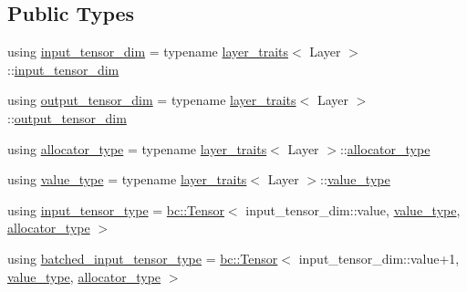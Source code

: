 \subsection*{Public Types}
\begin{DoxyCompactItemize}
\item 
using \hyperlink{structbc_1_1nn_1_1Layer__Manager_a2f124b1c1df68e184adf91d16cf0a5c3}{input\+\_\+tensor\+\_\+dim} = typename \hyperlink{structbc_1_1nn_1_1layer__traits}{layer\+\_\+traits}$<$ Layer $>$\+::\hyperlink{structbc_1_1nn_1_1Layer__Manager_a2f124b1c1df68e184adf91d16cf0a5c3}{input\+\_\+tensor\+\_\+dim}
\item 
using \hyperlink{structbc_1_1nn_1_1Layer__Manager_aabdbf2c4a435aa8256a9a7fac4ee3fc2}{output\+\_\+tensor\+\_\+dim} = typename \hyperlink{structbc_1_1nn_1_1layer__traits}{layer\+\_\+traits}$<$ Layer $>$\+::\hyperlink{structbc_1_1nn_1_1Layer__Manager_aabdbf2c4a435aa8256a9a7fac4ee3fc2}{output\+\_\+tensor\+\_\+dim}
\item 
using \hyperlink{structbc_1_1nn_1_1Layer__Manager_a6618b1c4afdad0eafd781b319f27f230}{allocator\+\_\+type} = typename \hyperlink{structbc_1_1nn_1_1layer__traits}{layer\+\_\+traits}$<$ Layer $>$\+::\hyperlink{structbc_1_1nn_1_1Layer__Manager_a6618b1c4afdad0eafd781b319f27f230}{allocator\+\_\+type}
\item 
using \hyperlink{structbc_1_1nn_1_1Layer__Manager_af6edd9edf47c73bfc1b200b3cbf2155f}{value\+\_\+type} = typename \hyperlink{structbc_1_1nn_1_1layer__traits}{layer\+\_\+traits}$<$ Layer $>$\+::\hyperlink{structbc_1_1nn_1_1Layer__Manager_af6edd9edf47c73bfc1b200b3cbf2155f}{value\+\_\+type}
\item 
using \hyperlink{structbc_1_1nn_1_1Layer__Manager_aad655a7315acde4c1ff5530b8d4331d3}{input\+\_\+tensor\+\_\+type} = \hyperlink{namespacebc_a659391e47ab612be3ba6c18cf9c89159}{bc\+::\+Tensor}$<$ input\+\_\+tensor\+\_\+dim\+::value, \hyperlink{structbc_1_1nn_1_1Layer__Manager_af6edd9edf47c73bfc1b200b3cbf2155f}{value\+\_\+type}, \hyperlink{structbc_1_1nn_1_1Layer__Manager_a6618b1c4afdad0eafd781b319f27f230}{allocator\+\_\+type} $>$
\item 
using \hyperlink{structbc_1_1nn_1_1Layer__Manager_a6e6cd6d324cc79ca740eea2f2438eccb}{batched\+\_\+input\+\_\+tensor\+\_\+type} = \hyperlink{namespacebc_a659391e47ab612be3ba6c18cf9c89159}{bc\+::\+Tensor}$<$ input\+\_\+tensor\+\_\+dim\+::value+1, \hyperlink{structbc_1_1nn_1_1Layer__Manager_af6edd9edf47c73bfc1b200b3cbf2155f}{value\+\_\+type}, \hyperlink{structbc_1_1nn_1_1Layer__Manager_a6618b1c4afdad0eafd781b319f27f230}{allocator\+\_\+type} $>$

\end{DoxyCompactItemize}
